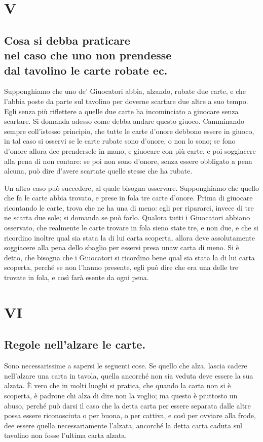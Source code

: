 \documentclass[11pt,a6paper]{article}
\begin{document}
\section{V}
\subsection*{Cosa si debba praticare\\ nel caso che uno non prendesse\\ dal tavolino le carte robate ec.}

Supponghiamo che uno de' Giuocatori abbia, alzando, rubate due carte, e che l'abbia poste da parte sul tavolino per doverne scartare due altre a suo tempo. Egli senza più riflettere a quelle due carte ha incominciato a giuocare senza scartare. Si domanda adesso come debba andare questo giuoco. Camminando sempre coll'istesso principio, che tutte le carte d'onore debbono essere in giuoco, in tal caso si osservi se le carte rubate sono d'onore, o non lo sono; se fono d'onore allora dee prendersele in mano, e giuocare con più carte, e poi soggiacere alla pena di non contare: se poi non sono d'onore, senza essere obbligato a pena
alcuna, può dire d'avere scartate quelle stesse che ha rubate.

Un altro caso può succedere, al quale bisogna osservare. Supponghiamo che quello che fa le carte abbia trovato, e prese in fola tre carte d'onore. Prima di giuocare ricontando le carte, trova che ne ha una di meno: egli per ripararci, invece di tre ne scarta due sole; si domanda se può farlo. Qualora tutti i Giuocatori abbiano osservato, che realmente le carte trovare in fola sieno state tre, e non due, e che si ricordino inoltre qual sia stata la di lui carta scoperta, allora deve assolutamente soggiacere alla pena dello sbaglio per essersi presa unaw carta di meno. Si è detto, che bisogna che i Giuocatori si ricordino bene qual sia stata la di lui carta scoperta, perché se non l'hanno presente, egli può dire che era una delle tre trovate in fola, e così farà esente da ogni pena.


\section{VI}
\subsection*{Regole nell'alzare le carte.}

Sono necessarissime a sapersi le seguenti cose. Se quello che alza, lascia cadere nell'alzare una carta in tavola, quella ancorché non sia veduta deve essere la sua alzata. È vero che in molti luoghi si pratica, che quando la carta non si è scoperta, è padrone chi alza di dire non la voglio; ma questo è piuttosto un abuso, perché può darsi il caso che la detta carta per essere separata dalle altre possa essere riconosciuta o per buona, o per cattiva, e così per ovviare alla frode, dee essere quella necessariamente l'alzata, ancorché la detta carta caduta sul tavolino non fosse l'ultima carta alzata.
\end{document}
